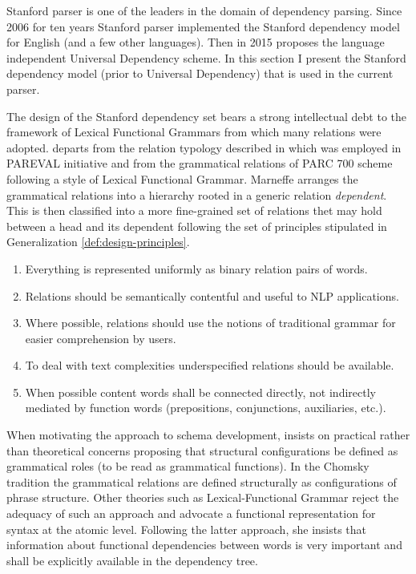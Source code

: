 Stanford parser is one of the leaders in the domain of dependency parsing. Since 2006 \citep{Marneffe2006} for ten years Stanford parser implemented the Stanford dependency model for English (and a few other languages). Then in 2015 \citet{Nivre2016ud} proposes the language independent Universal Dependency scheme. In this section I present the Stanford dependency model (prior to Universal Dependency) that is used in the current parser. 

The design of the Stanford dependency set \citep{Marneffe2006, Marneffe2008,  Marneffe2014, Silveira2014} bears a strong intellectual debt to the framework of Lexical Functional Grammars \citep{Brensan2000} from which many relations  were adopted. \citet{Marneffe2006} departs from the relation typology described in \citep{Carroll1999} which was employed in PAREVAL initiative \citep{Harrison1991} and from the grammatical relations of PARC 700 \citep{King2003} scheme following a style of Lexical Functional Grammar. Marneffe arranges the grammatical relations into a hierarchy rooted in a generic relation \textit{dependent}. This is then classified into a more fine-grained set of relations thet may hold between a head and its dependent following the set of principles \citep{Marneffe2008a} stipulated in Generalization \ref{def:design-principles}.

\begin{generalization}\label{def:design-principles}\leavevmode
    \begin{enumerate}
        \item Everything is represented uniformly as binary relation pairs of words.
        \item Relations should be semantically contentful and useful to NLP applications.
        \item Where possible, relations should use the notions of traditional grammar \citep{Quirk1985} for easier comprehension by users.
        \item To deal with text complexities underspecified relations should be available.
        \item When possible content words shall be connected directly, not indirectly mediated by function words (prepositions, conjunctions, auxiliaries, etc.).
    \end{enumerate}
\end{generalization}

When motivating the approach to schema development, \citet{Marneffe2006} insists on practical rather than theoretical concerns proposing that structural configurations be defined as grammatical roles (to be read as grammatical functions)\citep{Marneffe2006}. In the Chomsky tradition \citet{Chomsky1981} the grammatical relations are defined structurally as configurations of phrase structure. Other theories such as Lexical-Functional Grammar reject the adequacy of such an approach \citep{Brensan2000} and advocate a functional representation for syntax at the atomic level. Following the latter approach, she insists that information about functional dependencies between words is very important and shall be explicitly available in the dependency tree. 

